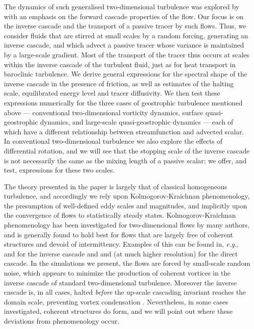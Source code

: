 \documentclass{jfm}
\newcommand{\eg}  {\textit{e.g., }}
\begin{document}
The dynamics of such generalised two-di\-men\-sion\-al turbulence was
explored by \citet{Pierrehumbert94} with an emphasis on the forward
cascade properties of the flow. Our focus is on the inverse cascade
and the transport of a passive tracer by such flows. Thus, we consider
fluids that are stirred at small scales by a random forcing,
generating an inverse cascade, and which advect a passive tracer whose
variance is maintained by a large-scale gradient. Most of the
transport of the tracer thus occurs at scales within the inverse
cascade of the turbulent fluid, just as for heat transport in
baroclinic turbulence. We derive general expressions for the spectral
shape of the inverse cascade in the presence of friction, as well as
estimates of the halting scale, equilibrated energy level and tracer
diffusivity. We then test these expressions numerically for the three
cases of geostrophic turbulence mentioned above --- conventional
two-dimensional vorticity dynamics, surface quasi-geostrophic
dynamics, and large-scale quasi-geostrophic dynamics --- each of which
have a different relationship between streamfunction and advected
scalar. In conventional two-dimensional turbulence we also explore the
effects of differential rotation, and we will see that the stopping
scale of the inverse cascade is not necessarily the same as the mixing
length of a passive scalar; we offer, and test, expressions for these
two scales.

The theory presented in the paper is largely that of classical
homogeneous turbulence, and accordingly we rely upon
Kolmogorov-Kraichnan phenomenology, the presumption of well-defined
eddy scales and magnitudes, and implicitly upon the convergence of
flows to statistically steady states.  Kolmogorov-Kraichnan
phenomenology has been investigated for two-dimensional flows by many
authors, and is generally found to hold best for flows that are
largely free of coherent structures and devoid of intermittency.
Examples of this can be found in, \eg \citet{Maltrud91} and
\citet{Sukoriansky99} for the inverse cascade and \citet{Oetzel97} and
(at much higher resolution) \citet{Lindborg00} for the direct cascade.
In the simulations we present, the flows are forced by small-scale
random noise, which appears to minimize the production of coherent
vortices in the inverse cascade of standard two-dimensional
turbulence.  Moreover the inverse cascade is, in all cases, halted
\emph{before} the up-scale cascading invariant reaches the domain
scale, preventing vortex condensation \citep{SmithYakhot93}.
Nevertheless, in some cases investigated, coherent structures do form,
and we will point out where these deviations from phenomenology occur.
\end{document}
